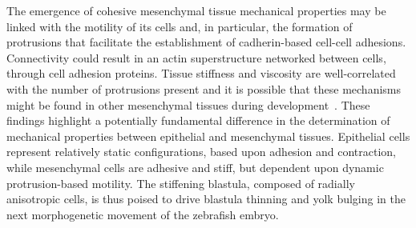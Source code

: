 The emergence of cohesive mesenchymal tissue mechanical properties may be linked with the motility of its cells and, in particular, the formation of protrusions that facilitate the establishment of cadherin-based cell-cell adhesions.
Connectivity could result in an actin superstructure networked between cells, through cell adhesion proteins.
Tissue stiffness and viscosity are well-correlated with the number of protrusions present and it is possible that these mechanisms might be found in other mesenchymal tissues during development~\cite{shawkyTissueMechanicsAdhesion2015}.
These findings highlight a potentially fundamental difference in the determination of mechanical properties between epithelial and mesenchymal tissues.
Epithelial cells represent relatively static configurations, based upon adhesion and contraction, while mesenchymal cells are adhesive and stiff, but dependent upon dynamic protrusion-based motility.
The stiffening blastula, composed of radially anisotropic cells, is thus poised to drive blastula thinning and yolk bulging in the next morphogenetic movement of the zebrafish embryo.

